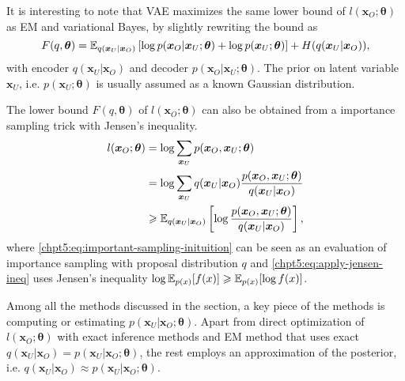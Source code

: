 It is interesting to note that VAE maximizes the same lower bound of $l(\bm{x}_O;\bm{\theta})$ as EM and variational Bayes, by slightly rewriting the bound as
\begin{equation}
  F(q, \bm{\theta}) = \mathbb{E}_{q(\bm{x}_U|\bm{x}_O)}\left[ \log{{p}(\bm{x}_O| \bm{x}_U; \bm{\theta})} + \log{{p}(\bm{x}_U; \bm{\theta})} \right] + H({q(\bm{x}_U|\bm{x}_O)}),
\end{equation}
with encoder $q(\bm{x}_U|\bm{x}_O)$ and decoder ${p}(\bm{x}_O| \bm{x}_U; \bm{\theta})$. The prior on latent variable $\bm{x}_U$, i.e. ${p}(\bm{x}_U; \bm{\theta})$ is usually assumed as a known Gaussian distribution.


\begin{remark}
  The lower bound $F(q, \bm{\theta})$ of $l(\bm{x}_O; \bm{\theta})$ can also be obtained from a importance sampling trick with Jensen's inequality.
  \begin{align}
    l(\bm{x}_O; \bm{\theta}) & = \log{\sum_{\bm{x}_U} {p}(\bm{x}_O, \bm{x}_U; \bm{\theta})} \nonumber \\
                             & = \log{\sum_{\bm{x}_U} {q(\bm{x}_U|\bm{x}_O)}\frac{{p}(\bm{x}_O, \bm{x}_U; \bm{\theta})}{q(\bm{x}_U|\bm{x}_O)} } \label{chpt5:eq:important-sampling-inituition}\\
                             & \geqslant \mathbb{E}_{q(\bm{x}_U|\bm{x}_O)}\left[ \log{\frac{{p}(\bm{x}_O, \bm{x}_U; \bm{\theta})}{q(\bm{x}_U|\bm{x}_O)}}\right] \label{chpt5:eq:apply-jensen-ineq},
  \end{align}
  where \eqref{chpt5:eq:important-sampling-inituition} can be seen as an evaluation of importance sampling with proposal distribution $q$ and \eqref{chpt5:eq:apply-jensen-ineq} uses Jensen's inequality $\log{\mathbb{E}_{p(x)}[f(x)] \geqslant\mathbb{E}_{p(x)}[\log{f(x)}]}$.
\end{remark}

\begin{remark}
  Among all the methods discussed in the section, a key piece of the methods is computing or estimating $p(\bm{x}_U| \bm{x}_O; \bm{\theta})$. Apart from direct optimization of $l(\bm{x}_O;\bm{\theta})$ with exact inference methods and EM method that uses exact $q(\bm{x}_U| \bm{x}_O) = p(\bm{x}_U| \bm{x}_O; \bm{\theta})$, the rest employs an approximation of the posterior, i.e. $q(\bm{x}_U| \bm{x}_O) \approx p(\bm{x}_U| \bm{x}_O; \bm{\theta})$.
\end{remark}

